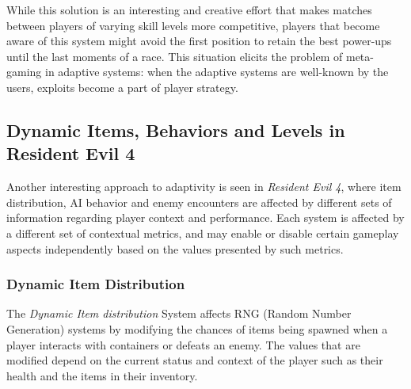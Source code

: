 While this solution is an interesting and creative effort that makes matches between players of varying skill levels more competitive, players that become aware of this system might avoid the first position to retain the best power-ups until the last moments of a race. This situation elicits the problem of meta-gaming in adaptive systems: when the adaptive systems are well-known by the users, exploits become a part of player strategy.


\subsection{Dynamic Items, Behaviors and Levels in Resident Evil 4}



Another interesting approach to adaptivity is seen in \emph{Resident Evil 4}, where item distribution, AI behavior and enemy encounters are affected by different sets of information regarding player context and performance. Each system is affected by a different set of contextual metrics, and may enable or disable certain gameplay aspects independently based on the values presented by such metrics.

\subsubsection{Dynamic Item Distribution}

The \emph{Dynamic Item distribution} System affects RNG (Random Number Generation) systems by modifying the chances of items being spawned when a player interacts with containers or defeats an enemy. The values that are modified depend on the current status and context of the player such as their health and the items in their inventory.

